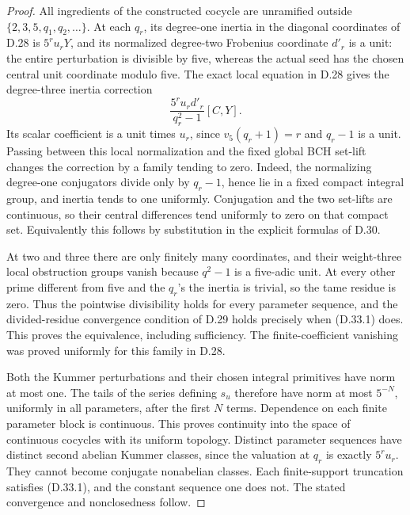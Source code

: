 \begin{proof}
All ingredients of the constructed cocycle are
unramified outside
\(\{2,3,5,q_1,q_2,\ldots\}\). At each
\(q_r\), its degree-one inertia in the
diagonal coordinates of D.28 is
\(5^ru_rY\), and its normalized degree-two
Frobenius coordinate \(d'_r\) is a unit:
the entire perturbation is divisible by five,
whereas the actual seed has the chosen central
unit coordinate modulo five. The exact local
equation in D.28 gives the degree-three
inertia correction
\[
              \frac{5^ru_r d'_r}{q_r^2-1}[C,Y].             \tag{D.33.2}
\]
Its scalar coefficient is a unit times \(u_r\),
since \(v_5(q_r+1)=r\) and \(q_r-1\) is
a unit. Passing between this local normalization
and the fixed global BCH set-lift changes the
correction by a family tending to zero. Indeed,
the normalizing degree-one conjugators divide
only by \(q_r-1\), hence lie in a fixed
compact integral group, and inertia tends to
one uniformly. Conjugation and the two
set-lifts are continuous, so their central
differences tend uniformly to zero on that
compact set. Equivalently this follows by
substitution in the explicit formulas of D.30.

At two and three there are only finitely many
coordinates, and their weight-three local
obstruction groups vanish because \(q^2-1\)
is a five-adic unit. At every other prime
different from five and the \(q_r\)'s the
inertia is trivial, so the tame residue is
zero. Thus the pointwise divisibility holds
for every parameter sequence, and the
divided-residue convergence condition of D.29
holds precisely when (D.33.1) does. This proves
the equivalence, including sufficiency.
The finite-coefficient vanishing was proved
uniformly for this family in D.28.

Both the Kummer perturbations and their
chosen integral primitives have norm at most
one. The tails of the series defining \(s_u\)
therefore have norm at most \(5^{-N}\),
uniformly in all parameters, after the first
\(N\) terms. Dependence on each finite
parameter block is continuous. This proves
continuity into the space of continuous
cocycles with its uniform topology.
Distinct parameter sequences have distinct
second abelian Kummer classes, since the
valuation at \(q_r\) is exactly \(5^ru_r\).
They cannot become conjugate nonabelian
classes. Each finite-support truncation
satisfies (D.33.1), and the constant sequence
one does not. The stated convergence and
nonclosedness follow.
\end{proof}

